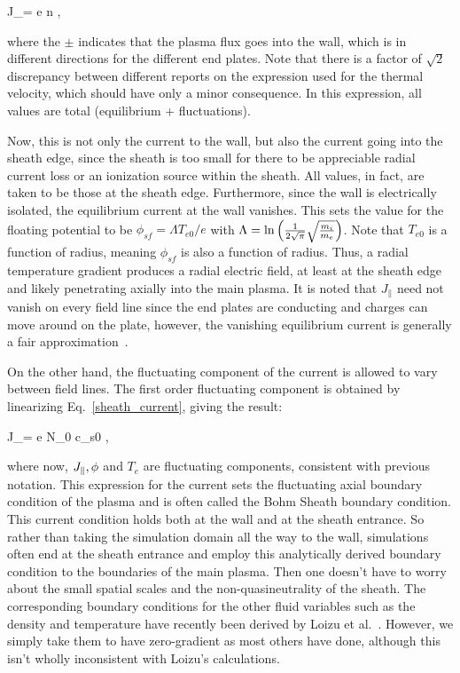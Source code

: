 \beq
\label{sheath_current}
J_\parallel = \pm e n ,
\eeq

where the $\pm$ indicates that the plasma flux goes into the wall, which is in different directions for the different end plates.
Note that there is a factor of $\sqrt{2}$ discrepancy between different reports on the expression used for the thermal velocity, which should have only a minor consequence.
In this expression, all values are total (equilibrium + fluctuations).

Now, this is not only the current to the wall, but also the current going into the sheath edge, since the sheath is too small for there to be appreciable radial current loss or an ionization source
within the sheath. All values, in fact, are taken to be those at the sheath edge.
Furthermore, since the wall is electrically isolated, the equilibrium current at the wall vanishes.
This sets the value for the floating potential to be $\phi_{sf} = \Lambda T_{e0} / e$ with $\Lambda = {\rm ln} \left(\frac{1}{2 \sqrt{\pi}} \sqrt{\frac{m_i}{m_e}} \right)$.
Note that $T_{e0}$ is a function of radius, meaning $\phi_{sf}$ is also a function of radius. Thus, a radial temperature gradient produces a radial
electric field, at least at the sheath edge and likely penetrating axially into the main plasma. 
It is noted that $J_\parallel$ need not vanish on every field line since the end plates are conducting and charges can move around on the plate, 
however, the vanishing equilibrium current is generally a fair approximation~\cite{berk1993}.

On the other hand, the fluctuating component of the current is allowed to vary between field lines.
The first order fluctuating component is obtained by linearizing Eq.~\ref{sheath_current}, giving the result:

\beq
\label{lin_sheath_current}
J_\parallel = \pm e N_0 c_{s0} ,
\eeq

where now, $J_\parallel, \phi$ and $T_e$ are fluctuating components, consistent with previous notation.
This expression for the current sets the fluctuating axial boundary condition of the plasma and is often called the Bohm Sheath boundary condition. This current condition holds both at
the wall and at the sheath entrance. So rather than taking the simulation
domain all the way to the wall, simulations often end at the sheath entrance and employ this analytically derived boundary condition to the boundaries of the main plasma. 
Then one doesn't have to worry about the small spatial scales and the non-quasineutrality of the sheath.
The corresponding boundary conditions for the other fluid variables such as the density and temperature have recently been derived by Loizu et al.~\cite{loizu2012}. However, we
simply take them to have zero-gradient as most others have done, although this isn't wholly inconsistent with Loizu's calculations.

